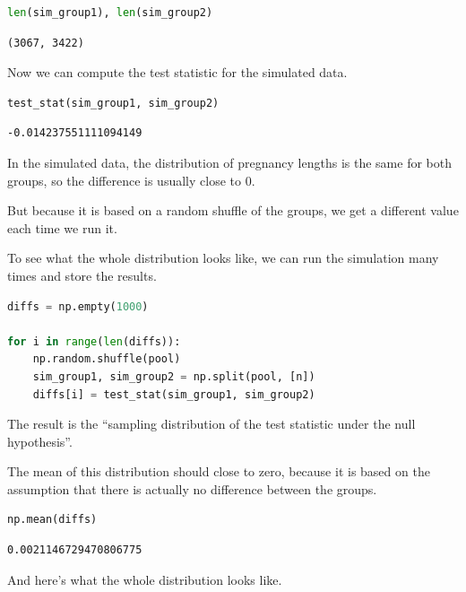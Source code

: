\begin{lstlisting}[language=Python,style=source]
len(sim_group1), len(sim_group2)
\end{lstlisting}

\begin{lstlisting}[style=output]
(3067, 3422)
\end{lstlisting}

Now we can compute the test statistic for the simulated data.

\begin{lstlisting}[language=Python,style=source]
test_stat(sim_group1, sim_group2)
\end{lstlisting}

\begin{lstlisting}[style=output]
-0.014237551111094149
\end{lstlisting}

In the simulated data, the distribution of pregnancy lengths is the same
for both groups, so the difference is usually close to 0.

But because it is based on a random shuffle of the groups, we get a
different value each time we run it.

To see what the whole distribution looks like, we can run the simulation
many times and store the results.

\begin{lstlisting}[language=Python,style=source]
diffs = np.empty(1000)

for i in range(len(diffs)):
    np.random.shuffle(pool)
    sim_group1, sim_group2 = np.split(pool, [n])
    diffs[i] = test_stat(sim_group1, sim_group2)
\end{lstlisting}

The result is the ``sampling distribution of the test statistic under
the null hypothesis''.

The mean of this distribution should close to zero, because it is based
on the assumption that there is actually no difference between the
groups.

\begin{lstlisting}[language=Python,style=source]
np.mean(diffs)
\end{lstlisting}

\begin{lstlisting}[style=output]
0.0021146729470806775
\end{lstlisting}

And here's what the whole distribution looks like.

